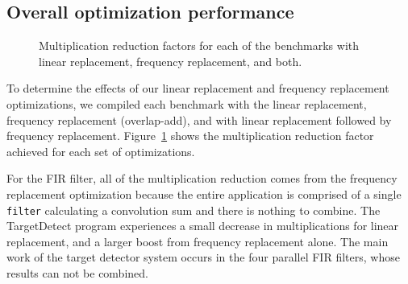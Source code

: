 \subsection{Overall optimization performance}



\begin{figure}
\center
\epsfxsize=3.2in
\vspace{-6pt}
\caption{Multiplication reduction factors for each of the benchmarks with linear replacement, frequency replacement, and both.}
\label{fig:linear-freq-both}
\vspace{-12pt}
\end{figure}

To determine the effects of our linear replacement and frequency replacement 
optimizations, we compiled each benchmark with the linear 
replacement, frequency replacement (overlap-add),
and with linear replacement followed by frequency replacement. 
Figure~\ref{fig:linear-freq-both} shows the multiplication reduction factor 
achieved for each set of optimizations.

For the FIR filter, all of the multiplication reduction comes from the frequency
replacement optimization because the entire application is comprised of a single
{\tt filter} calculating a convolution sum and there is nothing to combine.
The TargetDetect program experiences a small decrease in multiplications 
for linear replacement, and a larger boost from frequency replacement alone.
The main work of the target detector system occurs in the four parallel FIR filters, whose
results can not be combined.

